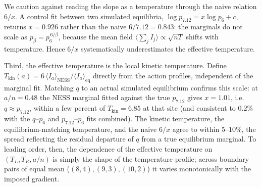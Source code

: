 \documentclass[11pt,a4paper]{article}
\theoremstyle{definition}
\numberwithin{equation}{section}   %
\begin{document}
We caution against reading the slope as a temperature through the naive
relation $6/x$. A control fit between two simulated equilibria,
$\log p_{7.12}=x\log p_6+c$, returns $x=0.926$ rather than the naive
$6/7.12=0.843$: the marginals do not scale as $p_\beta=p_6^{\,6/\beta}$,
because the mean field $\langle\sum_j I_j\rangle\propto\sqrt{nT}$ shifts with
temperature. Hence $6/x$ systematically underestimates the effective
temperature.

Third, the effective temperature is the local kinetic temperature. Define
$T_{\mathrm{kin}}(a)=6\,\langle I_a\rangle_{\mathrm{NESS}}/
\langle I_a\rangle_{\mathrm{eq}}$ directly from the action profiles, independent
of the marginal fit. Matching $q$ to an actual simulated equilibrium confirms
this scale: at $a/n=0.48$ the NESS marginal fitted against the true $p_{7.12}$
gives $x=1.01$, i.e.\ $q\approx p_{7.12}$, within a few percent of
$T_{\mathrm{kin}}=6.85$ at that site (and consistent to $0.2\%$ with the
$q$--$p_6$ and $p_{7.12}$--$p_6$ fits combined). The kinetic temperature, the
equilibrium-matching temperature, and the naive $6/x$ agree to within
$5$--$10\%$, the spread reflecting the residual departure of $q$ from a true
equilibrium marginal. To leading order, then, the dependence of the effective
temperature on $(T_L,T_R,a/n)$ is simply the shape of the temperature profile;
across boundary pairs of equal mean ($(8,4),(9,3),(10,2)$) it varies
monotonically with the imposed gradient.
\end{document}
